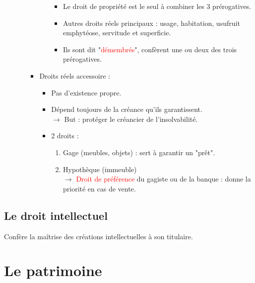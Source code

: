 \begin{enumerate}
\begin{itemize}
\begin{itemize}
\begin{itemize}
\begin{itemize}
	    	    	    	    \item Le droit de propriété est le seul à combiner les 3 prérogatives.
	    	    	    	    \item Autres droits réels principaux : usage, habitation, usufruit emphytéose, servitude et superficie.
	    	    	    	    \item Ils sont dit "\textcolor{red}{démembrés}", confèrent une ou deux des trois prérogatives.
	    	    	    \end{itemize}
	    	    \end{itemize}\smallskip
	    	    \item Droits réels accessoire :
	    	    \begin{itemize}
	    	    	    \item Pas d'existence propre.
	    	    	    \item Dépend toujours de la créance qu'ils garantissent.\\
	    	    	    $\rightarrow$ But : protéger le créancier de l'insolvabilité.
	    	    	    \item 2 droits :
	    	    	    \begin{enumerate}
	    	    	    	    \item Gage (meubles, objets) : sert à garantir un "prêt".
	    	    	    	    \item Hypothèque (immeuble)\\
	    	    	    	    $\rightarrow$ \textcolor{red}{Droit de préférence} du gagiste ou de la banque : donne la priorité en cas de vente.
	    	    	    \end{enumerate}
	    	    \end{itemize}
	    \end{itemize}
	\end{itemize}
\end{enumerate}

\subsection{Le droit intellectuel}

Confère la maîtrise des créations intellectuelles à son titulaire.

\section{Le patrimoine}


